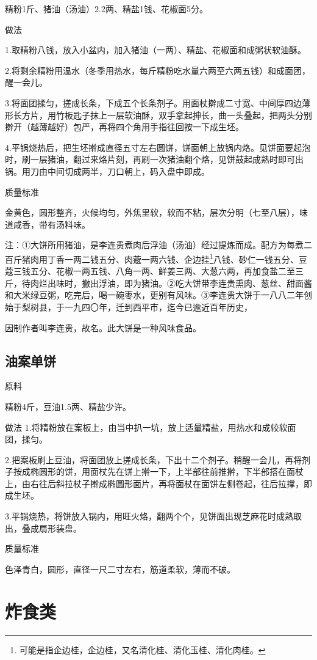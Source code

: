 \documentclass{ctexbook}
\begin{document}
精粉1斤、猪油（汤油）2.2两、精盐1钱、花椒面5分。

做法

1.取精粉八钱，放入小盆内，加入猪油（一两）、精盐、花椒面和成粥状软油酥。

2.将剩余精粉用温水（冬季用热水，每斤精粉吃水量六两至六两五钱）和成面团，醒一会儿。

3.将面团揉匀，搓成长条，下成五个长条剂子。用面杖擀成二寸宽、中间厚四边薄形长方片，用竹板匙子抹上一层软油酥，双手拿起抻长，曲一头叠起，把两头分别擀开（越薄越好）包严，再将四个角用手指往回按一下成生坯。

4.平锅烧热后，把生坯擀成直径五寸左右圆饼，饼面朝上放锅内烙。见饼面要起泡时，刷一层猪油，翻过来烙片刻，再刷一次猪油翻个烙，见饼鼓起成熟时即可出锅。用刀由中间切成两半，刀口朝上，码入盘中即成。

质量标准

金黄色，圆形整齐，火候均匀，外焦里软，软而不粘，层次分明（七至八层），味道咸香，带有汤料味。

注：①大饼所用猪油，是李连贵煮肉后浮油（汤油）经过提炼而成。配方为每煮二百斤猪肉用丁香一两二钱五分、肉蔲一两六钱、企边挂\footnote{可能是指企边桂，企边桂，又名清化桂、清化玉桂、清化肉桂。}八钱、砂仁一钱五分、豆蔻三钱五分、花椒一两五钱、八角一两、鲜姜三两、大葱六两，再加食盐二至三斤，待肉烂出味时，撇出浮油，即为猪油。②吃大饼带李连贵熏肉、葱丝、甜面酱和大米绿豆粥，吃完后，喝一碗枣水，更别有风味。③李连贵大饼于一八八二年创始于梨树县，于一九四〇年，迁到西平市，迄今已逾近百年历史，

因制作者叫李连贵，故名。此大饼是一种风味食品。
\subsection{油案单饼}
原料

精粉4斤，豆油1.5两、精盐少许。

做法
1.将精粉放在案板上，由当中扒一坑，放上适量精盐，用热水和成较软面团，揉匀。

2.把案板刷上豆油，将面团放上搓成长条，下出十二个剂子。稍醒一会儿，再将剂子按成椭圆形的饼，用面杖先在饼上擀一下，上半部往前推擀，下半部搭在面杖上，由右往后斜拉杖子擀成椭圆形面片，再将面杖在面饼左侧卷起，往后拉撑，即成生坯。

3.平锅烧热，将饼放入锅内，用旺火烙，翻两个个，见饼面出现芝麻花时成熟取出，叠成扇形装盘。

质量标准

色泽青白，圆形，直径一尺二寸左右，筋道柔软，薄而不破。
\section{炸食类}
\end{document}
